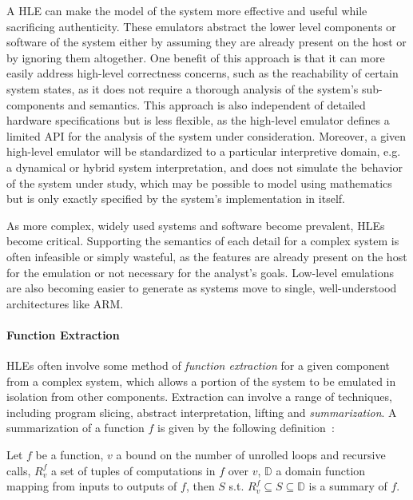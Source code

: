 A HLE can make the model of the system more effective and useful while sacrificing authenticity.
These emulators abstract the lower level components or software of the system either by assuming they are already present on the host or by ignoring them altogether.
One benefit of this approach is that it can more easily address high-level correctness concerns, such as the reachability of certain system states, as it does not require a thorough analysis of the system's sub-components and semantics.
This approach is also independent of detailed hardware specifications but is less flexible, as the high-level emulator defines a limited API for the analysis of the system under consideration.
Moreover, a given high-level emulator will be standardized to a particular interpretive domain, e.g. a dynamical or hybrid system interpretation, and does not simulate the behavior of the system under study, which may be possible to model using mathematics but is only exactly specified by the system's implementation in itself.

As more complex, widely used systems and software become prevalent, HLEs become critical.
Supporting the semantics of each detail for a complex system is often infeasible or simply wasteful, as the features are already present on the host for the emulation or not necessary for the analyst's goals.
Low-level emulations are also becoming easier to generate as systems move to single, well-understood architectures like ARM.

\paragraph{Function Extraction}
HLEs often involve some method of \emph{function extraction} for a given component from a complex system, which allows a portion of the system to be emulated in isolation from other components.
Extraction can involve a range of techniques, including program slicing, abstract interpretation, lifting and \emph{summarization}.
A summarization of a function $f$ is given by the following definition~\cite{interpolation}:

\begin{definition}
\label{def:summarization}
Let $f$ be a function, $v$ a bound on the number of unrolled loops and recursive calls, $R_{v}^{f}$ a set of tuples of computations in $f$ over $v$, $\mathbb{D}$ a domain function mapping from inputs to outputs of $f$, then $S$ s.t. $R_{v}^{f} \subseteq S \subseteq \mathbb{D}$ is a summary of $f$.
\end{definition}

